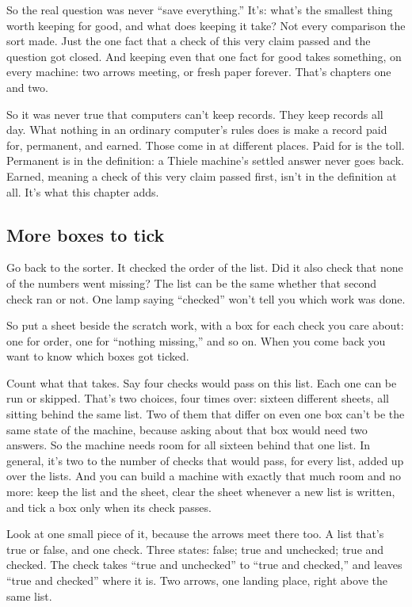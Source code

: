 \documentclass[11pt,twoside]{article}
\theoremstyle{thielethm}
\theoremstyle{thieledef}
\theoremstyle{thieledef}
\theoremstyle{thieledef}
\theoremstyle{thielethm}
\theoremstyle{thieleobs}
\theoremstyle{thielethm}
\begin{document}
So the real question was never ``save everything.'' It's: what's the smallest thing worth keeping for good, and what does keeping it take? Not every comparison the sort made. Just the one fact that a check of this very claim passed and the question got closed. And keeping even that one fact for good takes something, on every machine: two arrows meeting, or fresh paper forever. That's chapters one and two.

So it was never true that computers can't keep records. They keep records all day. What nothing in an ordinary computer's rules does is make a record paid for, permanent, and earned. Those come in at different places. Paid for is the toll. Permanent is in the definition: a Thiele machine's settled answer never goes back. Earned, meaning a check of this very claim passed first, isn't in the definition at all. It's what this chapter adds.

\subsection{More boxes to tick}

Go back to the sorter. It checked the order of the list. Did it also check that none of the numbers went missing? The list can be the same whether that second check ran or not. One lamp saying ``checked'' won't tell you which work was done.

So put a sheet beside the scratch work, with a box for each check you care about: one for order, one for ``nothing missing,'' and so on. When you come back you want to know which boxes got ticked.

Count what that takes. Say four checks would pass on this list. Each one can be run or skipped. That's two choices, four times over: sixteen different sheets, all sitting behind the same list. Two of them that differ on even one box can't be the same state of the machine, because asking about that box would need two answers. So the machine needs room for all sixteen behind that one list. In general, it's two to the number of checks that would pass, for every list, added up over the lists. And you can build a machine with exactly that much room and no more: keep the list and the sheet, clear the sheet whenever a new list is written, and tick a box only when its check passes.

Look at one small piece of it, because the arrows meet there too. A list that's true or false, and one check. Three states: false; true and unchecked; true and checked. The check takes ``true and unchecked'' to ``true and checked,'' and leaves ``true and checked'' where it is. Two arrows, one landing place, right above the same list.
\end{document}
